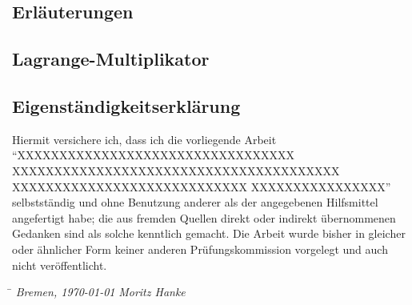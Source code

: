 \documentclass[12pt, a4paper]{report}\usepackage[]{graphicx}\usepackage[]{color}
\begin{document}
\begin{appendix}

\chapter{Erläuterungen}
\section{Lagrange-Multiplikator}\label{Lagrange-Multiplikator}


\newpage
\section*{Eigenständigkeitserklärung}
\thispagestyle{empty}
Hiermit versichere ich, dass ich die vorliegende Arbeit "`XXXXXXXXXXXXXXXXXXXXXXXXXXXXXXXXX XXXXXXXXXXXXXXXXXXXXXXXXXXXXXXXXXXXXXXX XXXXXXXXXXXXXXXXXXXXXXXXXXXX XXXXXXXXXXXXXXXX"' selbstständig und ohne Benutzung anderer als der angegebenen 
Hilfsmittel angefertigt habe; die aus fremden Quellen direkt oder indirekt übernommenen Gedanken sind als solche kenntlich gemacht. 
Die Arbeit wurde bisher in gleicher oder ähnlicher Form keiner anderen Prüfungskommission vorgelegt und auch nicht veröffentlicht.
\vspace{3cm}
\begin{tabbing}
\hspace{6cm}  \= \kill
\textit{Bremen, \today} \> \textit{Moritz Hanke}
\end{tabbing}

\end{appendix}
\end{document}

